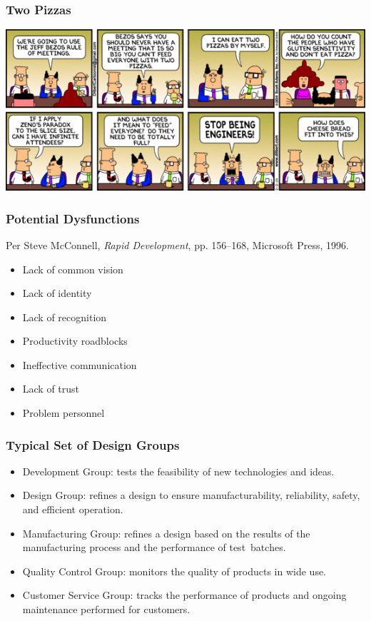 \begin{frame}
\frametitle{Two Pizzas}
\begin{changemargin}{1.5cm}
\includegraphics[width=.8\textwidth]{images/twopizzas.png}
\end{changemargin}
\end{frame}



\begin{frame}

\frametitle{Potential Dysfunctions}

\begin{changemargin}{2.5cm}
Per Steve McConnell, \emph{Rapid Development}, 
pp. 156--168, Microsoft Press, 1996.
\begin{itemize}
\item Lack of common vision
\item Lack of identity
\item Lack of recognition
\item Productivity roadblocks
\item Ineffective communication
\item Lack of trust
\item Problem personnel
\end{itemize}
\end{changemargin}

\end{frame}

\begin{frame}

\frametitle{Typical Set of Design Groups}

\begin{changemargin}{2em}

\begin{itemize}
\item \alert{Development Group}: tests the feasibility of new technologies and ideas.
\item \alert{Design Group}: refines a design to ensure manufacturability, reliability, safety, and efficient operation.
\item \alert{Manufacturing Group}: refines a design based on the results of the manufacturing process and the performance of test~batches.
\item \alert{Quality Control Group}: monitors the quality of products in wide use.
\item \alert{Customer Service Group}: tracks the performance of products and ongoing maintenance performed for customers.
\end{itemize}
\end{changemargin}

\end{frame}

